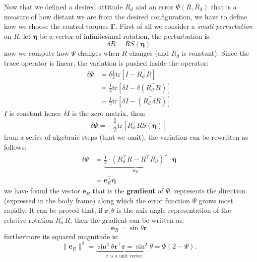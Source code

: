 \documentclass[10pt, a4paper]{report}
\begin{document}
\noindent Now that we defined a desired attitude $R_d$ and an error $\Psi(R,R_d)$ that is a measure of how distant we are from the desired configuration, we have to define how we choose the control torques $\boldsymbol\Gamma$. First of all we consider a \textit{small perturbation} on $R$, let $\boldsymbol{\eta}$ be a vector of infinitesimal rotation, the perturbation is:\begin{equation}
    \delta R= R S(\boldsymbol{\eta})
\end{equation}
now we compute how $\Psi$ changes when $R$ changes (and $R_d$ is constant). Since the trace operator is linear, the variation is pushed inside the operator:\begin{align}
    \delta\Psi&=\delta\frac{1}{2}\text{tr}\left[I-R_d^\top R\right]\\ 
    &=\frac{1}{2}\text{tr}\left[\delta I-\delta(R_d^\top R)\right]\\
    &=\frac{1}{2}\text{tr}\left[\delta I-(R_d^\top\delta R)\right]
\end{align}
$I$ is constant hence $\delta I$ is the zero matrix, then:\begin{equation}
     \delta\Psi=-\frac{1}{2}\text{tr}\left[R_d^\top R S(\boldsymbol{\eta})\right]
\end{equation}
from a series of algebraic steps (that we omit), the variation can be rewritten as follows:
\begin{align}
     \delta\Psi&=\underbrace{\frac{1}{2}\cdot \left(
        R_d^\top R-R^\top R_d
     \right)^\vee}_{\mathbf e_R}\cdot\boldsymbol{\eta}\\
     &=\mathbf e_R^\top \boldsymbol{\eta}
\end{align}
we have found the vector $\mathbf e_R$ that is the \textbf{gradient} of $\Psi$, represents the direction (expressed in the body frame) along which the error function $\Psi$ grows most rapidly. It can be proved that, if $\mathbf r,\theta$ is the axis-angle representation of the relative rotation $R_d^\top R$, then the gradient can be written as:\begin{equation}
    \mathbf e_R=\sin\theta\mathbf r
\end{equation}
furthermore its squared magnitude is:\begin{equation}
    \|\mathbf e_R\|^2=\underbrace{\sin^2\theta\mathbf r^\top \mathbf r=\sin^2\theta}_{\mathbf r \text{ is a unit vector}}=\Psi(2-\Psi).
\end{equation}
\end{document}

